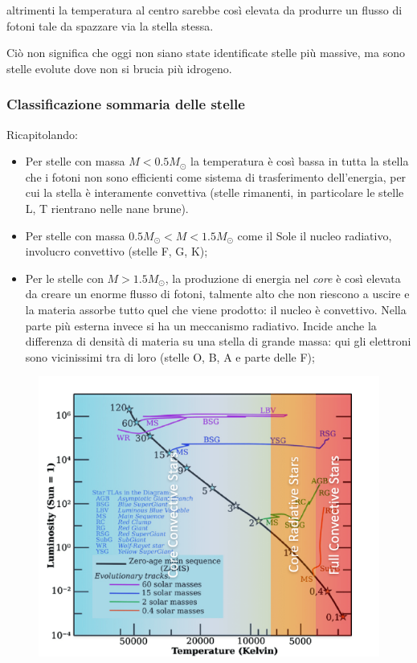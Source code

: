 altrimenti la temperatura al centro sarebbe così elevata da produrre un flusso di fotoni tale da spazzare via la stella stessa.

Ciò non significa che oggi non siano state identificate stelle più massive, ma sono stelle evolute dove non si brucia più idrogeno.

\subsubsection{Classificazione sommaria delle stelle}
Ricapitolando: 
\begin{itemize}
    \item Per stelle con massa $M<0.5 M_{\odot}$ la temperatura è così bassa in tutta la stella che i fotoni non sono efficienti come sistema di trasferimento dell'energia, per cui la stella è interamente convettiva (stelle rimanenti, in particolare le stelle L, T rientrano nelle nane brune).
    \item Per stelle con massa $0.5M_{\odot}<M<1.5 M_{\odot}$ come il Sole il nucleo radiativo, involucro convettivo (stelle F, G, K);
    \item Per le stelle con $M>1.5M_{\odot}$, la produzione di energia nel \textit{core} è così elevata da creare un enorme flusso di fotoni, talmente alto che non riescono a uscire e la materia assorbe tutto quel che viene prodotto: il nucleo è convettivo. Nella parte più esterna invece si ha un meccanismo radiativo. Incide anche la differenza di densità di materia su una stella di grande massa: qui gli elettroni sono vicinissimi tra di loro (stelle O, B, A e parte delle F);
\end{itemize}

\begin{figure}[H]
    \centering
    \includegraphics[scale=0.8]{hr_core.png}
    \label{fig:my_label}
\end{figure}

